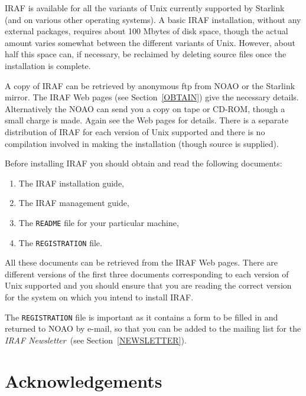 \documentclass[twoside,11pt]{article}
\newcommand{\htmladdnormallink}[2]{#1}
\begin{document}
IRAF is available for all the variants of Unix currently supported by
Starlink (and on various other operating systems).  A basic IRAF
installation, without any external packages, requires about 100
Mbytes of disk space, though the actual amount varies somewhat between
the different variants of Unix.  However, about half this space can,
if necessary, be reclaimed by deleting source files once the installation
is complete.

A copy of IRAF can be retrieved by anonymous ftp from NOAO or the
Starlink mirror.  The \htmladdnormallink{IRAF Web pages}
{http://www.starlink.rl.ac.uk/iraf/web/iraf-homepage.html}
(see Section~\ref{OBTAIN}) give the necessary details.  Alternatively
the NOAO can send you a copy on tape or CD-ROM, though a small charge
is made.  Again see the Web pages for details.  There is a separate
distribution of IRAF for each version of Unix supported and there
is no compilation involved in making the installation (though source
is supplied).

Before installing IRAF you should obtain and read the following
documents:

\begin{enumerate}

  \item The IRAF installation guide,

  \item The IRAF management guide,

  \item The {\tt README} file for your particular machine,

  \item The {\tt REGISTRATION} file.

\end{enumerate}

All these documents can be retrieved from the IRAF Web pages.  There
are different versions of the \htmladdnormallink{first three documents}
{http://www.starlink.rl.ac.uk/iraf/web/docs/igsm.html}
corresponding to each version of Unix supported and you should ensure
that you are reading the correct version for the system on which you
intend to install IRAF.

The {\tt REGISTRATION} file is important as it contains a form to be
filled in and returned to NOAO by e-mail, so that you can be added to
the mailing list for the {\it IRAF Newsletter}\, (see
Section~\ref{NEWSLETTER}).


\newpage
{}
\section*{Acknowledgements}
\end{document}

